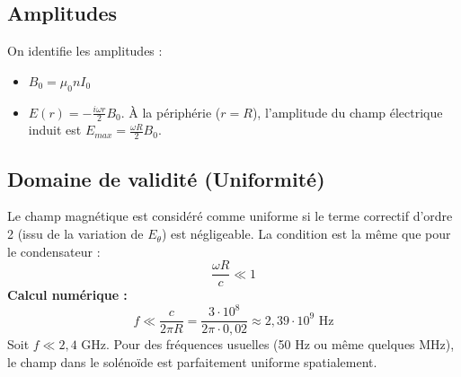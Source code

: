 \documentclass[french]{yLectureNote}
\begin{document}
\subsection{Amplitudes}

On identifie les amplitudes :
\begin{itemize}
    \item $B_0 = \mu_0 n I_0$
    \item $E(r) = - \frac{i\omega r}{2} B_0$. À la périphérie ($r=R$), l'amplitude du champ électrique induit est $E_{max} = \frac{\omega R}{2} B_0$.
\end{itemize}

\subsection{Domaine de validité (Uniformité)}

Le champ magnétique est considéré comme uniforme si le terme correctif d'ordre 2 (issu de la variation de $E_\theta$) est négligeable. La condition est la même que pour le condensateur : 
\[ \frac{\omega R}{c} \ll 1 \]
\textbf{Calcul numérique :} 
\[ f \ll \frac{c}{2\pi R} = \frac{3 \cdot 10^8}{2\pi \cdot 0,02} \approx 2,39 \cdot 10^9 \text{ Hz} \]
Soit $f \ll 2,4$ GHz. Pour des fréquences usuelles (50 Hz ou même quelques MHz), le champ dans le solénoïde est parfaitement uniforme spatialement.
\end{document}
